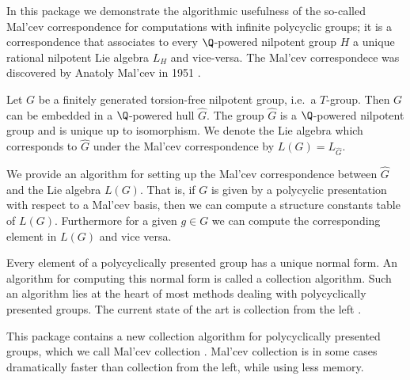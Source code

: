 

In this package we demonstrate the algorithmic usefulness of the
so-called Mal'cev correspondence for computations with infinite polycyclic
groups; it is a correspondence
that associates to every $\Q$-powered nilpotent group $H$ a
unique rational nilpotent Lie algebra $L_H$ and vice-versa.
The Mal'cev correspondece was discovered 
by Anatoly Mal'cev in 1951 \cite{Mal51}.


Let $G$ be a finitely generated torsion-free nilpotent group, 
i.e.\ a $T$-group.
Then $G$ can be embedded in a $\Q$-powered hull $\hat{G}$.
The group $\hat{G}$ is
a $\Q$-powered nilpotent group and  
is unique up to isomorphism. 
We denote the Lie algebra
which corresponds to $\hat{G}$ under the Mal'cev correspondence by
$L(G)= L_{\hat{G}}$.

We provide an algorithm for setting up the 
Mal'cev correspondence
between $\hat{G}$ and the Lie algebra $L(G)$. 
That is, if $G$
is given by a polycyclic presentation with respect to a Mal'cev basis,
then we can compute a structure constants table of $L(G)$.
Furthermore for a given $g\in G$ we can compute the corresponding 
element in $L(G)$ and vice versa. 


Every element of a
polycyclically presented
group has a unique normal form. An algorithm for computing this normal
form is called a collection algorithm. Such an algorithm
lies at the heart of most methods
dealing with polycyclically presented groups. The current state of
the art is collection from the left 
\cite{Geb02,LGS90,VLe90}.

This package contains
a new collection algorithm for polycyclically presented groups,
which we call Mal'cev collection \cite{ALi07}.
Mal'cev collection is
in some cases dramatically faster than
collection from the left, while using less memory.







